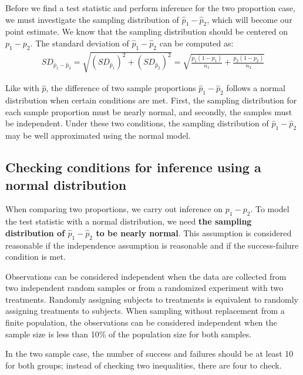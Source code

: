 Before we find a test statistic and perform inference for the two proportion case, we must investigate the sampling distribution of $\hat{p}_1-\hat{p}_2$, which will become our point estimate.  We know that the sampling distribution should be centered on $p_1-p_2$.  The standard deviation of $\hat{p}_1-\hat{p}_2$ can be computed as:
\begin{align*}
SD_{\hat{p}_1 - \hat{p}_2}
	= \sqrt{(SD_{\hat{p}_1})^2 + (SD_{\hat{p}_2})^2} 
	= \sqrt{\frac{p_1(1-p_1)}{n_1} + \frac{p_2(1-p_2)}{n_2}}
\end{align*}

Like with $\hat{p}$, the difference of two sample proportions $\hat{p}_1-\hat{p}_2$ follows a normal distribution when certain conditions are met.  First, the sampling distribution for each sample proportion must be nearly normal, and secondly, the samples must be independent. Under these two conditions, the sampling distribution of $\hat{p}_1 - \hat{p}_2$ may be well approximated using the normal model.


\subsection{Checking conditions for inference using a normal distribution}
When comparing two proportions, we carry out inference on $p_1-p_2$.  To model the test statistic with a normal distribution, we need \textbf{the sampling distribution of $\hat{p}_1-\hat{p}_2$ to be nearly normal}.  This assumption is considered reasonable if the independence assumption is reasonable and if the success-failure condition is met.
\begin{description}
\setlength{\itemsep}{0mm}
\item[Independence.] Observations can be considered independent when the data are collected from two independent random samples or from a randomized experiment with two treatments.  Randomly assigning subjects to treatments is equivalent to randomly assigning treatments to subjects.  When sampling without replacement from a finite population, the observations can be considered independent when the sample size is less than 10\% of the population size for both samples.
\item[Success-failure condition.] In the two sample case, the number of success and failures should be at least 10 for both groups; instead of checking two inequalities, there are four to check.
\end{description}



